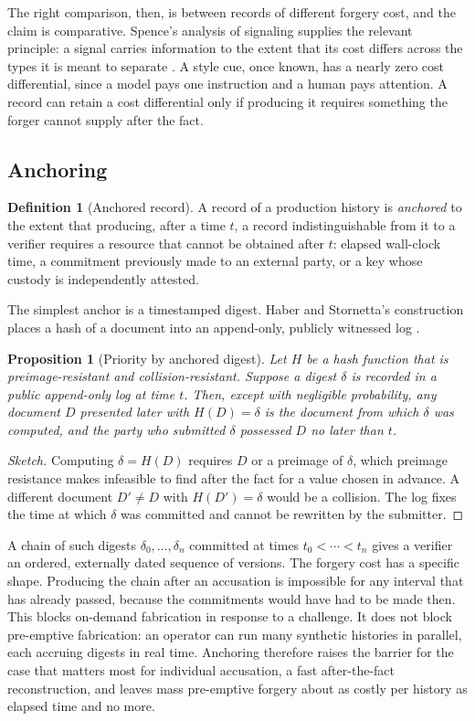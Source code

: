 \documentclass[11pt]{article}
\theoremstyle{plain}
\newtheorem{proposition}{Proposition}
\theoremstyle{definition}
\newtheorem{definition}{Definition}
\theoremstyle{remark}
\begin{document}
The right comparison, then, is between records of different forgery cost, and the claim is comparative. Spence's analysis of signaling supplies the relevant principle: a signal carries information to the extent that its cost differs across the types it is meant to separate \cite{spence1973}. A style cue, once known, has a nearly zero cost differential, since a model pays one instruction and a human pays attention. A record can retain a cost differential only if producing it requires something the forger cannot supply after the fact.

\subsection{Anchoring}

\begin{definition}[Anchored record]
A record of a production history is \emph{anchored} to the extent that producing, after a time $t$, a record indistinguishable from it to a verifier requires a resource that cannot be obtained after $t$: elapsed wall-clock time, a commitment previously made to an external party, or a key whose custody is independently attested.
\end{definition}

The simplest anchor is a timestamped digest. Haber and Stornetta's construction places a hash of a document into an append-only, publicly witnessed log \cite{haber1991}.

\begin{proposition}[Priority by anchored digest]\label{prop:anchor}
Let $H$ be a hash function that is preimage-resistant and collision-resistant. Suppose a digest $\delta$ is recorded in a public append-only log at time $t$. Then, except with negligible probability, any document $D$ presented later with $H(D)=\delta$ is the document from which $\delta$ was computed, and the party who submitted $\delta$ possessed $D$ no later than $t$.
\end{proposition}

\begin{proof}[Sketch]
Computing $\delta=H(D)$ requires $D$ or a preimage of $\delta$, which preimage resistance makes infeasible to find after the fact for a value chosen in advance. A different document $D'\neq D$ with $H(D')=\delta$ would be a collision. The log fixes the time at which $\delta$ was committed and cannot be rewritten by the submitter.
\end{proof}

A chain of such digests $\delta_0,\ldots,\delta_n$ committed at times $t_0<\cdots<t_n$ gives a verifier an ordered, externally dated sequence of versions. The forgery cost has a specific shape. Producing the chain after an accusation is impossible for any interval that has already passed, because the commitments would have had to be made then. This blocks on-demand fabrication in response to a challenge. It does not block pre-emptive fabrication: an operator can run many synthetic histories in parallel, each accruing digests in real time. Anchoring therefore raises the barrier for the case that matters most for individual accusation, a fast after-the-fact reconstruction, and leaves mass pre-emptive forgery about as costly per history as elapsed time and no more.
\end{document}
